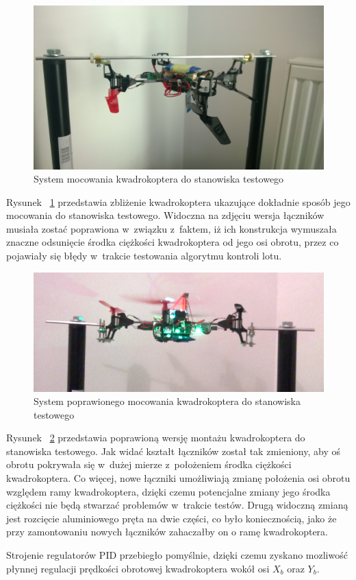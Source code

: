 \begin{figure}[H]
	\centering
	\includegraphics[scale=0.12]{Pictures/QuadroTestStationZoom.jpg}
	\caption[System mocowania kwadrokoptera do stanowiska testowego]{System mocowania kwadrokoptera do stanowiska testowego}
	\label{fig:QuadroTestStationZoom}
\end{figure}

Rysunek ~\ref{fig:QuadroTestStationZoom} przedstawia zbliżenie kwadrokoptera ukazujące dokładnie sposób jego mocowania do stanowiska testowego. Widoczna na zdjęciu wersja łączników musiała zostać poprawiona w~związku z~faktem, iż ich konstrukcja wymuszała znaczne odsunięcie środka ciężkości kwadrokoptera od jego osi obrotu, przez co pojawiały się błędy w~trakcie testowania algorytmu kontroli lotu. 

\begin{figure}[H]
	\centering
	\includegraphics[scale=0.55]{Pictures/quadro_mont_poprawiony.png}
	\caption[System poprawionego mocowania kwadrokoptera do stanowiska testowego]{System poprawionego mocowania kwadrokoptera do stanowiska testowego}
	\label{fig:QuadroTestStationZoomPoprawiony}
\end{figure}

Rysunek ~\ref{fig:QuadroTestStationZoomPoprawiony} przedstawia poprawioną wersję montażu kwadrokoptera do stanowiska testowego. Jak widać kształt łączników został tak zmieniony, aby oś obrotu pokrywała się w~dużej mierze z~położeniem środka ciężkości kwadrokoptera. Co więcej, nowe łączniki umożliwiają zmianę położenia osi obrotu względem ramy kwadrokoptera, dzięki czemu potencjalne zmiany jego środka ciężkości nie będą stwarzać problemów w~trakcie testów. Drugą widoczną zmianą jest rozcięcie aluminiowego pręta na dwie części, co było koniecznością, jako że przy zamontowaniu nowych łączników zahaczałby on o ramę kwadrokoptera.

Strojenie regulatorów PID przebiegło pomyślnie, dzięki czemu zyskano mozliwość płynnej regulacji prędkości obrotowej kwadrokoptera wokół osi $X_b$ oraz $Y_b$. 
